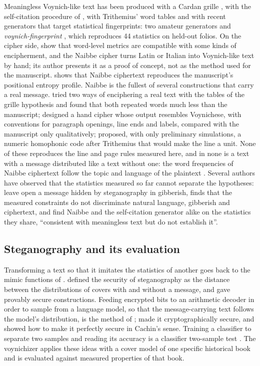 Meaningless Voynich-like text has been produced with a Cardan grille \citep{rugg2004,zandbergen2021grille}, with the
self-citation procedure of \citet{timmschinner2020}, with Trithemius' word tables \citep{hermes2022} and with
recent generators that target statistical fingerprints: two amateur generators \citep{whitehatnetizen2026} and
\emph{voynich-fingerprint} \citep{sachak2026}, which reproduces 44 statistics on held-out folios. On the cipher side,
\citet{bowerngaskell2022} show that word-level metrics are compatible with some kinds of encipherment, and the Naibbe
cipher \citep{greshko2025} turns Latin or Italian into Voynich-like text by hand; its author presents it as a proof of
concept, not as the method used for the manuscript. \citet{kinnison2026} shows that Naibbe ciphertext reproduces the
manuscript's positional entropy profile. Naibbe is the fullest of several constructions that carry a real message.
\citet{rugg2004sciam} tried two ways of enciphering a real text with the tables of the grille hypothesis and found that both repeated words
much less than the manuscript; \citet{feaster2019} designed a hand cipher whose output resembles Voynichese, with
conventions for paragraph openings, line ends and labels, compared with the manuscript only qualitatively;
\citet{matlach2022} proposed, with only preliminary simulations, a numeric homophonic code after Trithemius that would make
the line a unit. None of these reproduces the line and page rules measured here, and in none is a text with a message
distributed like a text without one: the word frequencies of Naibbe ciphertext follow the topic and language of the
plaintext \citep[supplementary materials]{greshko2025}. Several authors have observed that the statistics measured so
far cannot separate the hypotheses: \citet{gaskellbowern2022} leave open a message hidden by steganography in
gibberish, \citet{parisel2026a} finds that the measured constraints do not discriminate natural language,
gibberish and ciphertext, and \citet{rozanova2026} find Naibbe and the self-citation generator alike on the
statistics they share, ``consistent with meaningless text but do not establish it''.

\subsection{Steganography and its evaluation}

Transforming a text so that it imitates the statistics of another goes back to the mimic functions of
\citet{wayner1992}. \citet{cachin1998} defined the security of steganography as the distance between the distributions
of covers with and without a message, and \citet{hopper2002} gave provably secure constructions. Feeding encrypted bits
to an arithmetic decoder in order to sample from a language model, so that the message-carrying text follows the
model's distribution, is the method of \citet{ziegler2019}; \citet{kaptchuk2021} made it cryptographically secure, and \citet{dewitt2023} showed how to make
it perfectly secure in Cachin's sense.
Training a classifier to separate two samples and reading its accuracy is a classifier two-sample test
\citep{lopezpaz2017}. The voynichizer applies these ideas with a cover model of one specific historical book and is
evaluated against measured properties of that book.
